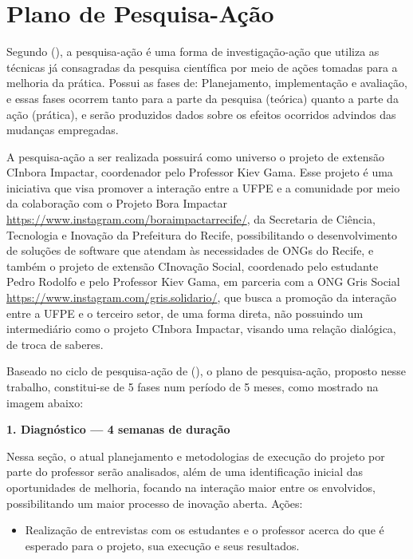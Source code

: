 \section{Plano de Pesquisa-Ação}
\label{pesquisaacao}

Segundo \citeauthor{tripp2005} (\citeyear{tripp2005}), a pesquisa-ação é uma forma de investigação-ação que utiliza as técnicas já consagradas da pesquisa científica por meio de ações tomadas para a melhoria da prática. Possui as fases de: Planejamento, implementação e avaliação, e essas fases ocorrem tanto para a parte da pesquisa (teórica) quanto a parte da ação (prática), e serão produzidos dados sobre os efeitos ocorridos advindos das mudanças empregadas.

A pesquisa-ação a ser realizada possuirá como universo o projeto de extensão CInbora Impactar, coordenador pelo Professor Kiev Gama. Esse projeto é uma iniciativa que visa promover a interação entre a \gls{UFPE} e a comunidade por meio da colaboração com o Projeto Bora Impactar \url{https://www.instagram.com/boraimpactarrecife/}, da Secretaria de Ciência, Tecnologia e Inovação da Prefeitura do Recife, possibilitando o desenvolvimento de soluções de software que atendam às necessidades de \gls{ONG}s do Recife, e também o projeto de extensão CInovação Social, coordenado pelo estudante Pedro Rodolfo e pelo Professor Kiev Gama, em parceria com a ONG Gris Social \url{https://www.instagram.com/gris.solidario/}, que busca a promoção da interação entre a \gls{UFPE} e o terceiro setor, de uma forma direta, não possuindo um intermediário como o projeto CInbora Impactar, visando uma relação dialógica, de troca de saberes.

\par\vspace{1\baselineskip}



Baseado no ciclo de pesquisa-ação de \citeauthor{staron2020} (\citeyear{staron2020}), o plano de pesquisa-ação, proposto nesse trabalho, constitui-se de 5 fases num período de 5 meses, como mostrado na imagem abaixo:




\textbf{1. Diagnóstico — 4 semanas de duração}

Nessa seção, o atual planejamento e metodologias de execução do projeto por parte do professor serão analisados, além de uma identificação inicial das oportunidades de melhoria, focando na interação maior entre os envolvidos, possibilitando um maior processo de inovação aberta. 
Ações: 
\begin{itemize}
\item Realização de entrevistas com os estudantes e o professor acerca do que é esperado para o projeto, sua execução e seus resultados. 
\par\vspace{1\baselineskip}

\end{itemize}

